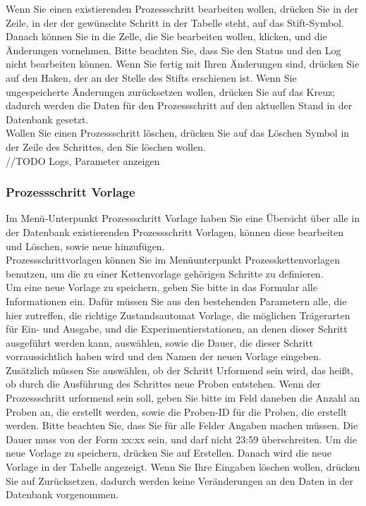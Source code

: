 \documentclass[enabledeprecatedfontcommands,fontsize=12pt,paper=a4,twoside]{scrartcl}
\begin{document}
Wenn Sie einen existierenden Prozessschritt bearbeiten wollen, drücken Sie in der Zeile, in der der gewünschte Schritt in der Tabelle steht, auf das Stift-Symbol. Danach können Sie in die Zelle, die Sie bearbeiten wollen, klicken, und die Änderungen vornehmen. Bitte beachten Sie, dass Sie den Status und den Log nicht bearbeiten können. Wenn Sie fertig mit Ihren Änderungen sind, drücken Sie auf den Haken, der an der Stelle des Stifts erschienen ist. Wenn Sie ungespeicherte Änderungen zurücksetzen wollen, drücken Sie auf das Kreuz; dadurch werden die Daten für den Prozessschritt auf den aktuellen Stand in der Datenbank gesetzt. \\


Wollen Sie einen Prozessschritt löschen, drücken Sie auf das Löschen Symbol in der Zeile des Schrittes, den Sie löschen wollen. \\

//TODO Logs, Parameter anzeigen
\subsubsection{Prozessschritt Vorlage}

Im Menü-Unterpunkt Prozessschritt Vorlage haben Sie eine Übersicht über alle in der Datenbank existierenden Prozessschritt Vorlagen, können diese bearbeiten und Löschen, sowie neue hinzufügen. \\

Prozessschrittvorlagen können Sie im Menüunterpunkt Prozesskettenvorlagen benutzen, um die zu einer Kettenvorlage gehörigen Schritte zu definieren. \\

Um eine neue Vorlage zu speichern, geben Sie bitte in das Formular alle Informationen ein. Dafür müssen Sie aus den bestehenden Parametern alle, die hier zutreffen, die richtige Zustandsautomat Vorlage, die möglichen Trägerarten für Ein- und Ausgabe, und die Experimentierstationen, an denen dieser Schritt ausgeführt werden kann, auswählen, sowie die Dauer, die dieser Schritt vorraussichtlich haben wird und den Namen der neuen Vorlage eingeben. Zusätzlich müssen Sie auswählen, ob der Schritt Urformend sein wird, das heißt, ob durch die Ausführung des Schrittes neue Proben entstehen. Wenn der Prozessschritt urformend sein soll, geben Sie bitte im Feld daneben die Anzahl an Proben an, die erstellt werden, sowie die Proben-ID für die Proben, die erstellt werden. Bitte beachten Sie, dass Sie für alle Felder Angaben machen müssen. Die Dauer muss von der Form xx:xx sein, und darf nicht 23:59 überschreiten. Um die neue Vorlage zu speichern, drücken Sie auf Erstellen. Danach wird die neue Vorlage in der Tabelle angezeigt. Wenn Sie Ihre Eingaben löschen wollen, drücken Sie auf Zurücksetzen, dadurch werden keine Veränderungen an den Daten in der Datenbank vorgenommen. \\
\end{document}
